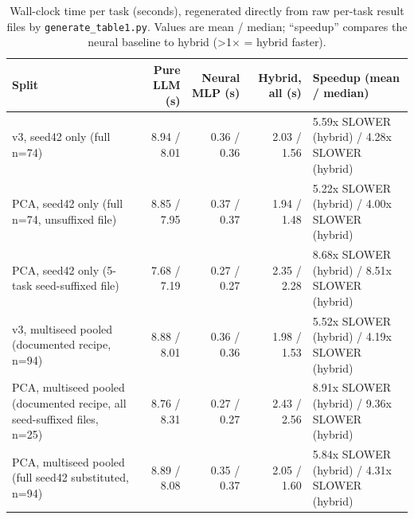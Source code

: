 \begin{table}[h]
\centering
\caption{Wall-clock time per task (seconds), regenerated directly from raw per-task result files by \texttt{generate\_table1.py}. Values are mean / median; ``speedup'' compares the neural baseline to hybrid (>1$\times$ = hybrid faster).}
\label{tab:timing}
\begin{tabular}{lrrrl}
\toprule
Split & Pure LLM (s) & Neural MLP (s) & Hybrid, all (s) & Speedup (mean / median) \\
\midrule
v3, seed42 only (full n=74) & 8.94 / 8.01 & 0.36 / 0.36 & 2.03 / 1.56 & 5.59x SLOWER (hybrid) / 4.28x SLOWER (hybrid) \\
PCA, seed42 only (full n=74, unsuffixed file) & 8.85 / 7.95 & 0.37 / 0.37 & 1.94 / 1.48 & 5.22x SLOWER (hybrid) / 4.00x SLOWER (hybrid) \\
PCA, seed42 only (5-task seed-suffixed file) & 7.68 / 7.19 & 0.27 / 0.27 & 2.35 / 2.28 & 8.68x SLOWER (hybrid) / 8.51x SLOWER (hybrid) \\
v3, multiseed pooled (documented recipe, n=94) & 8.88 / 8.01 & 0.36 / 0.36 & 1.98 / 1.53 & 5.52x SLOWER (hybrid) / 4.19x SLOWER (hybrid) \\
PCA, multiseed pooled (documented recipe, all seed-suffixed files, n=25) & 8.76 / 8.31 & 0.27 / 0.27 & 2.43 / 2.56 & 8.91x SLOWER (hybrid) / 9.36x SLOWER (hybrid) \\
PCA, multiseed pooled (full seed42 substituted, n=94) & 8.89 / 8.08 & 0.35 / 0.37 & 2.05 / 1.60 & 5.84x SLOWER (hybrid) / 4.31x SLOWER (hybrid) \\
\bottomrule
\end{tabular}
\end{table}

